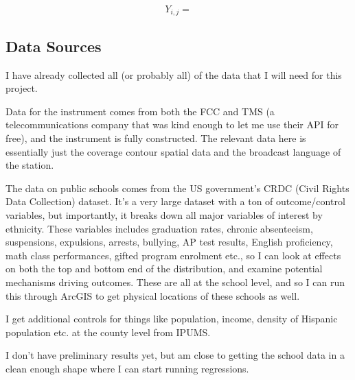 \documentclass{article}
\begin{document}
\[ Y_{i,j} =  \]

\subsection*{Data Sources}

I have already collected all (or probably all) of the data that I will need for this project.

Data for the instrument comes from both the FCC and TMS (a telecommunications company that was kind enough to let me use their API for free), and the instrument is fully constructed. The relevant data here is essentially just the coverage contour spatial data and the broadcast language of the station.

The data on public schools comes from the US government's CRDC (Civil Rights Data Collection) dataset. It's a very large dataset with a ton of outcome/control variables, but importantly, it breaks down all major variables of interest by ethnicity. These variables includes graduation rates, chronic absenteeism, suspensions, expulsions, arrests, bullying, AP test results, English proficiency, math class performances, gifted program enrolment etc., so I can look at effects on both the top and bottom end of the distribution, and examine potential mechanisms driving outcomes. These are all at the school level, and so I can run this through ArcGIS to get physical locations of these schools as well.

I get additional controls for things like population, income, density of Hispanic population etc. at the county level from IPUMS.

I don't have preliminary results yet, but am close to getting the school data in a clean enough shape where I can start running regressions.




%
\end{document}
